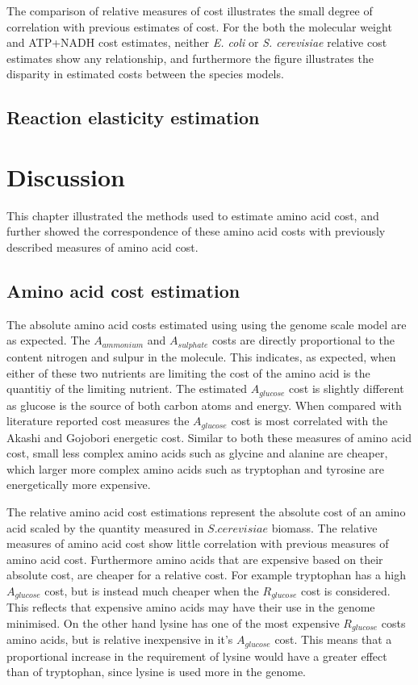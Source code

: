 The comparison of relative measures of cost illustrates the small degree of correlation with previous estimates of cost. For the both the molecular weight and ATP+NADH cost estimates, neither \emph{E. coli} or \emph{S. cerevisiae} relative cost estimates show any relationship, and furthermore the figure illustrates the disparity in estimated costs between the species models.

\subsection{Reaction elasticity estimation}

\section{Discussion}

This chapter illustrated the methods used to estimate amino acid cost, and further showed the correspondence of these amino acid costs with previously described measures of amino acid cost.

\subsection{Amino acid cost estimation}

The absolute amino acid costs estimated using using the genome scale model are as expected. The $A_{ammonium}$ and $A_{sulphate}$ costs are directly proportional to the content nitrogen and sulpur in the molecule. This indicates, as expected, when either of these two nutrients are limiting the cost of the amino acid is the quantitiy of the limiting nutrient. The estimated $A_{glucose}$ cost is slightly different as glucose is the source of both carbon atoms and energy. When compared with literature reported cost measures the $A_{glucose}$ cost is most correlated with the Akashi and Gojobori energetic cost. Similar to both these measures of amino acid cost, small less complex amino acids such as glycine and alanine are cheaper, which larger more complex amino acids such as tryptophan and tyrosine are energetically more expensive.

The relative amino acid cost estimations represent the absolute cost of an amino acid scaled by the quantity measured in $S. cerevisiae$ biomass. The relative measures of amino acid cost show little correlation with previous measures of amino acid cost. Furthermore amino acids that are expensive based on their absolute cost, are cheaper for a relative cost. For example tryptophan has a high $A_{glucose}$ cost, but is instead much cheaper when the $R_{glucose}$ cost is considered. This reflects that expensive amino acids may have their use in the genome minimised. On the other hand lysine has one of the most expensive $R_{glucose}$ costs amino acids, but is relative inexpensive in it's $A_{glucose}$ cost. This means that a proportional increase in the requirement of lysine would have a greater effect than of tryptophan, since lysine is used more in the genome.


